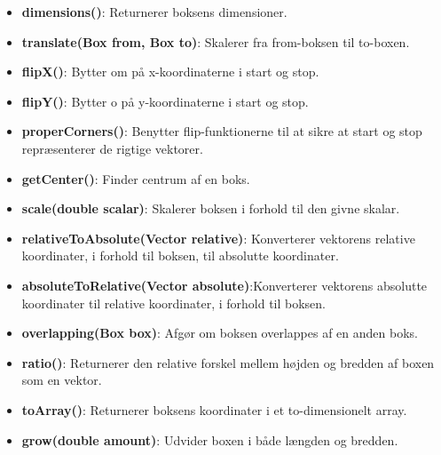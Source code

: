 \begin{itemize}
	\item \textbf{dimensions()}: Returnerer boksens dimensioner.
	\item \textbf{translate(Box from, Box to)}: Skalerer fra from-boksen til to-boxen.
	\item \textbf{flipX()}: Bytter om på x-koordinaterne i start og stop.
	\item \textbf{flipY()}:  Bytter o på y-koordinaterne i start og stop.
	\item \textbf{properCorners()}: Benytter flip-funktionerne til at sikre at start og stop repræsenterer de rigtige vektorer.
	\item \textbf{getCenter()}: Finder centrum af en boks.
	\item \textbf{scale(double scalar)}: Skalerer boksen i forhold til den givne skalar.
	\item \textbf{relativeToAbsolute(Vector relative)}: Konverterer vektorens relative koordinater, i forhold til boksen, til absolutte koordinater.
	\item \textbf{absoluteToRelative(Vector absolute)}:Konverterer vektorens absolutte koordinater til relative koordinater, i forhold til boksen.
	\item \textbf{overlapping(Box box)}: Afgør om boksen overlappes af en anden boks.
	\item \textbf{ratio()}: Returnerer den relative forskel mellem højden og bredden af boxen som en vektor.
	\item \textbf{toArray()}: Returnerer boksens koordinater i et to-dimensionelt array.
	\item \textbf{grow(double amount)}: Udvider boxen i både længden og bredden.
\end{itemize}